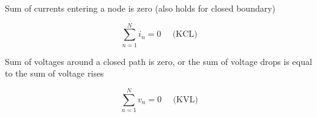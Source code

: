 


\pagestyle{fancy}

\lfoot[\vspace{-15pt} \hline]{\vspace{-15pt} \hline}
\rfoot[\vspace{-15pt} \hline]{\vspace{-15pt} \hline}
\cfoot[\thepage]{\thepage}



\begin{multicols}{2}

    \begin{justify}
      Sum of currents entering a node is zero (also holds for closed boundary)
    \end{justify}

        $$\boxed{\sum_{n=1}^N i_n=0\,\,\,\,\,\,\,\,\text{(KCL)}}$$

    \begin{justify}
      Sum of voltages around a closed path is zero, or the sum of voltage drops is equal to the sum of voltage rises
    \end{justify}

        $$\boxed{\sum_{n=1}^N v_n=0\,\,\,\,\,\,\,\,\text{(KVL)}}$$

\end{multicols}

